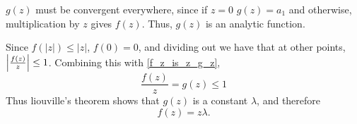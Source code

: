 \documentclass{homework}
\begin{document}
\begin{solution}
                                                                                                                                                                                                                                                                                        $g(z)$ must be convergent everywhere, since if $z = 0$ $g(z)=a_1$ and otherwise, multiplication by $z$ gives $f(z)$. Thus, $g(z)$ is an analytic function.

                                                                                                                                                                                                                                                                                        Since $f(|z|)\leq |z|$, $f(0)=0$, and dividing out we have that at other points, $\left|\frac{f(z)}{z}\right|\leq 1$. Combining this with \ref{f_z_is_z_g_z},
                                                                                                                                                                                                                                                                                        \[ 
                                                                                                                                                                                                                                                                                        \frac{f(z)}{z} = g(z) \leq 1
                                                                                                                                                                                                                                                                                        \]
                                                                                                                                                                                                                                                                                        Thus liouville's theorem shows that $g(z)$ is a constant $\lambda$, and therefore 
                                                                                                                                                                                                                                                                                        \[f(z) = z\lambda.\]
                                                                                                                                                                                                                                                                                        \end{solution}
\end{document}
